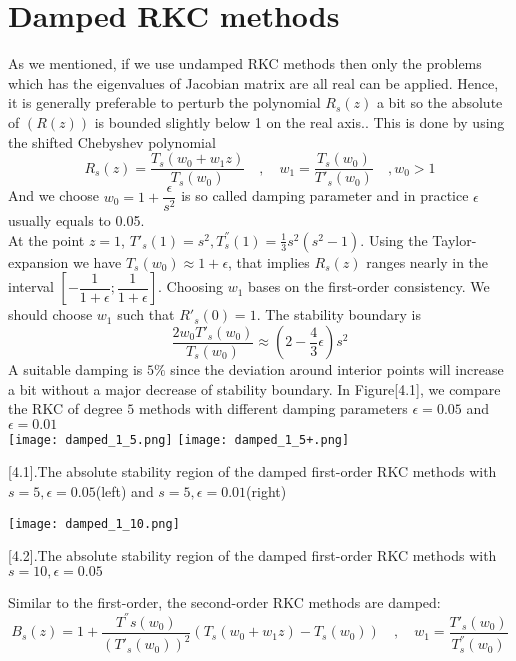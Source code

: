 \documentclass{article}
\theoremstyle{theorem}
\theoremstyle{definition}
\begin{document}
	\section{Damped RKC methods}
	As we mentioned, if we use undamped RKC methods then only the problems which has the eigenvalues of Jacobian matrix are all real can be applied. Hence, it is  generally preferable to perturb the polynomial $R_s(z)$ a bit so the absolute of $(R(z))$ is bounded slightly below 1 on the real axis.. This is done by using the shifted Chebyshev polynomial
	$$R_s(z)=\frac{T_s(w_0+w_1z)}{T_s(w_0)} \quad , \quad w_1=\frac{T_s(w_0)}{T'_s(w_0)} \quad , w_0>1$$
	And we choose $w_0=1+\dfrac{\epsilon}{s^2}$ is so called damping parameter and in practice $\epsilon$ usually equals to 0.05. \\
	At the point $z=1$, $T'_s(1)=s^2, T^{''}_s(1)=\frac{1}{3}s^2(s^2-1)$. Using the Taylor-expansion we have $T_s(w_0) \approx 1+ \epsilon$, that implies $R_s(z)$ ranges nearly in the interval $\left[-\dfrac{1}{1+\epsilon};\dfrac{1}{1+\epsilon}\right]$. Choosing $w_1$ bases on the first-order consistency. We should choose $w_1$ such that $R'_s(0)=1$. The stability boundary is $$\frac{2w_0T'_s(w_0)}{T_s(w_0)} \approx \left(2-\frac{4}{3} \epsilon\right)s^2$$
	A suitable damping is $5 \%$ since the deviation around interior points will increase a bit without  a major decrease of stability boundary. In Figure[4.1], we compare the RKC of degree $5$ methods with different damping parameters $\epsilon=0.05$ and $\epsilon=0.01$    \\
		\texttt{[image: damped\_1\_5.png]}	
	\texttt{[image: damped\_1\_5+.png]}	
			\begin{center}
					\figurename[4.1]{.The absolute stability region of the damped first-order RKC methods with $s=5, \epsilon =0.05$(left) and $s=5, \epsilon=0.01$(right)}
			\end{center}			
	\begin{center}
		\texttt{[image: damped\_1\_10.png]}
	\end{center}
	\begin{center}
			\figurename[4.2]{.The absolute stability region of the damped first-order RKC methods with $s=10, \epsilon =0.05$}
	\end{center}
Similar to the first-order, the second-order RKC methods are damped:
	$$B_s(z)=1+\frac{T^{''}s(w_0)}{(T'_s(w_0))^2}(T_s(w_0+w_1z)-T_s(w_0)) \quad, \quad w_1=\frac{T'_s(w_0)}{T^{''}_s(w_0)}$$
\end{document}
